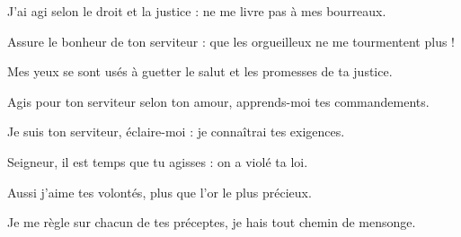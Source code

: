\item J'ai agi selon le droit et la justice : ne me livre pas à mes bourreaux.

\item Assure le bonheur de ton serviteur : que les orgueilleux ne me tourmentent plus !

\item Mes yeux se sont usés à guetter le salut et les promesses de ta justice.

\item Agis pour ton serviteur selon ton amour, apprends-moi tes commandements.

\item Je suis ton serviteur, éclaire-moi : je connaîtrai tes exigences.

\item Seigneur, il est temps que tu agisses : on a violé ta loi.

\item Aussi j'aime tes volontés, plus que l'or le plus précieux.

\item Je me règle sur chacun de tes préceptes, je hais tout chemin de mensonge.
